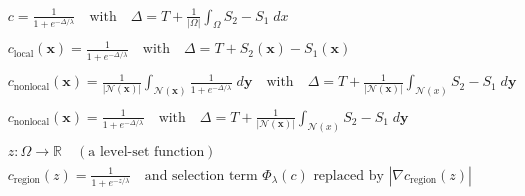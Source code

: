 \documentclass[11pt]{article}
\newcommand{\lam}{\lambda}
\newcommand{\x}{\boldsymbol{x}}
\newcommand{\y}{\boldsymbol{y}}
\begin{document}
\begin{align*}
&c = \frac{1}{1+e^{-\Delta/\lambda}} \quad\text{with}\quad\Delta=T+\frac{1}{|\Omega|}\int_\Omega S_2 - S_1 \; dx
\\\\
&c_{\text{local}}(\x) = \frac{1}{1+e^{-\Delta/\lambda}} \quad\text{with}\quad\Delta=T+S_2(\x) - S_1(\x)
\\\\
&c_{\text{nonlocal}}(\x) = \frac{1}{|\mathcal{N(\x)}|} \int_{\mathcal{N(\x)}}\frac{1}{1+e^{-\Delta/\lam}}\;d\y \quad\text{with}\quad \Delta = T + \frac{1}{|\mathcal{N}(\x)|}\int_{\mathcal{N}(x)} S_2-S_1\;d\y
\\\\
&c_{\text{nonlocal}}(\x) = \frac{1}{1+e^{-\Delta/\lambda}} \quad\text{with}\quad \Delta = T + \frac{1}{|\mathcal{N}(\x)|}\int_{\mathcal{N}(x)} S_2-S_1\;d\y
\\\\
&z : \Omega \rightarrow \mathbb{R} \quad (\text{a level-set function}) 
\\
&c_{\text{region}}(z) = \frac{1}{1+e^{-z/\lambda}} \quad\text{and selection term~}\Phi_\lam(c)\text{~replaced by~} |\nabla c_{\text{region}}(z)|
\end{align*}
\end{document}
